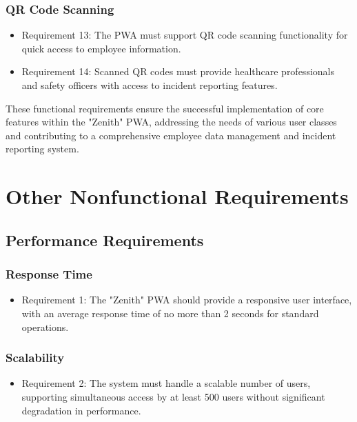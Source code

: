 \documentclass{scrreprt}
\begin{document}
\subsection{QR Code Scanning}

\begin{itemize}
    \item Requirement 13: The PWA must support QR code scanning functionality for quick access to employee information.
    \item Requirement 14: Scanned QR codes must provide healthcare professionals and safety officers with access to incident reporting features.
\end{itemize}

These functional requirements ensure the successful implementation of core features within the "Zenith" PWA, addressing the needs of various user classes and contributing to a comprehensive employee data management and incident reporting system.

\chapter{Other Nonfunctional Requirements}

\section{Performance Requirements}

\subsection{Response Time}

\begin{itemize}
    \item Requirement 1: The "Zenith" PWA should provide a responsive user interface, with an average response time of no more than 2 seconds for standard operations.
\end{itemize}

\subsection{Scalability}

\begin{itemize}
    \item Requirement 2: The system must handle a scalable number of users, supporting simultaneous access by at least 500 users without significant degradation in performance.
\end{itemize}
\end{document}
